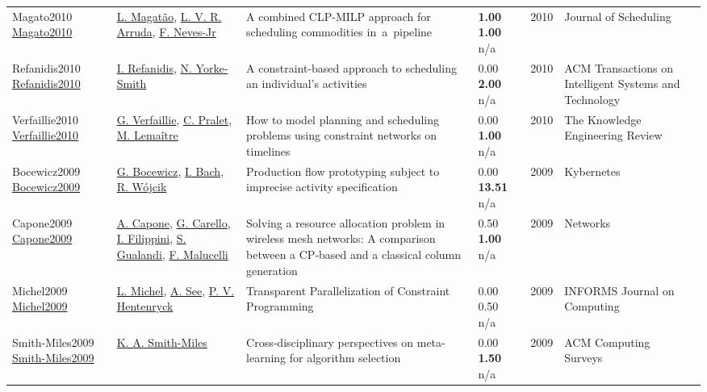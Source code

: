 {\begin{longtable}{p{3cm}p{5cm}p{10cm}p{1cm}rp{2.5cm}l}
Magato2010 \href{http://dx.doi.org/10.1007/s10951-010-0186-9}{Magato2010} & \hyperref[auth:a1808]{L. Magatão}, \hyperref[auth:a1809]{L. V. R. Arruda}, \hyperref[auth:a1810]{F. Neves-Jr} & A combined CLP-MILP approach for scheduling commodities in a pipeline & \noindent{}\textbf{1.00} \textbf{1.00} n/a & 2010 & Journal of Scheduling & \cite{Magato2010}\\
Refanidis2010 \href{http://dx.doi.org/10.1145/1869397.1869401}{Refanidis2010} & \hyperref[auth:a1546]{I. Refanidis}, \hyperref[auth:a19]{N. Yorke-Smith} & A constraint-based approach to scheduling an individual's activities & \noindent{}\textcolor{black!50}{0.00} \textbf{2.00} n/a & 2010 & ACM Transactions on Intelligent Systems and Technology & \cite{Refanidis2010}\\
Verfaillie2010 \href{http://dx.doi.org/10.1017/s0269888910000172}{Verfaillie2010} & \hyperref[auth:a1722]{G. Verfaillie}, \hyperref[auth:a1897]{C. Pralet}, \hyperref[auth:a2052]{M. Lemaître} & How to model planning and scheduling problems using constraint networks on timelines & \noindent{}\textcolor{black!50}{0.00} \textbf{1.00} n/a & 2010 & The Knowledge Engineering Review & \cite{Verfaillie2010}\\
Bocewicz2009 \href{http://dx.doi.org/10.1108/03684920910976989}{Bocewicz2009} & \hyperref[auth:a630]{G. Bocewicz}, \hyperref[auth:a631]{I. Bach}, \hyperref[auth:a1913]{R. Wójcik} & Production flow prototyping subject to imprecise activity specification & \noindent{}\textcolor{black!50}{0.00} \textbf{13.51} n/a & 2009 & Kybernetes & \cite{Bocewicz2009}\\
Capone2009 \href{http://dx.doi.org/10.1002/net.20367}{Capone2009} & \hyperref[auth:a1563]{A. Capone}, \hyperref[auth:a1564]{G. Carello}, \hyperref[auth:a1565]{I. Filippini}, \hyperref[auth:a1566]{S. Gualandi}, \hyperref[auth:a1567]{F. Malucelli} & Solving a resource allocation problem in wireless mesh networks: A comparison between a CP‐based and a classical column generation & \noindent{}0.50 \textbf{1.00} n/a & 2009 & Networks & \cite{Capone2009}\\
Michel2009 \href{http://dx.doi.org/10.1287/ijoc.1080.0313}{Michel2009} & \hyperref[auth:a32]{L. Michel}, \hyperref[auth:a1807]{A. See}, \hyperref[auth:a148]{P. V. Hentenryck} & Transparent Parallelization of Constraint Programming & \noindent{}\textcolor{black!50}{0.00} 0.50 n/a & 2009 & \cellcolor{red!20}INFORMS Journal on Computing & \cite{Michel2009}\\
Smith-Miles2009 \href{http://dx.doi.org/10.1145/1456650.1456656}{Smith-Miles2009} & \hyperref[auth:a1742]{K. A. Smith-Miles} & Cross-disciplinary perspectives on meta-learning for algorithm selection & \noindent{}\textcolor{black!50}{0.00} \textbf{1.50} n/a & 2009 & ACM Computing Surveys & \cite{Smith-Miles2009}\\

\end{longtable}}
